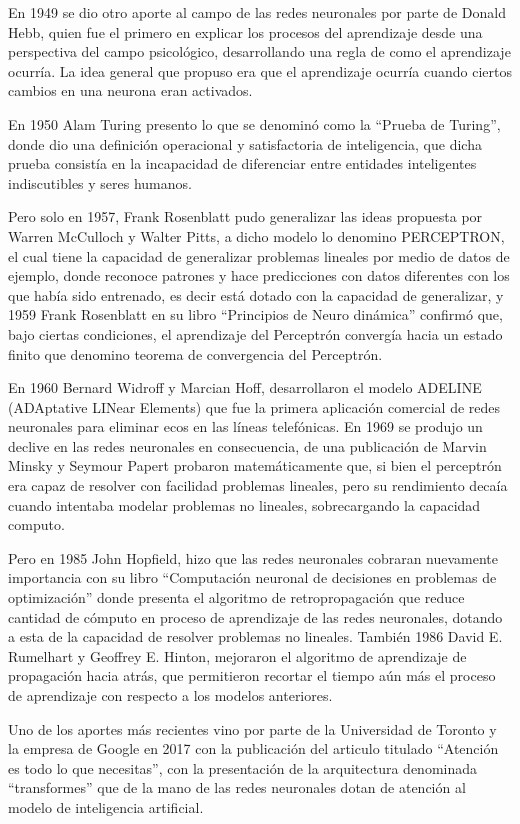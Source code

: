 \documentclass[
  12pt,
]{article}
\begin{document}
En 1949 se dio otro aporte al campo de las redes neuronales por parte de
Donald Hebb, quien fue el primero en explicar los procesos del
aprendizaje desde una perspectiva del campo psicológico, desarrollando
una regla de como el aprendizaje ocurría. La idea general que propuso
era que el aprendizaje ocurría cuando ciertos cambios en una neurona
eran activados.

En 1950 Alam Turing presento lo que se denominó como la ``Prueba de
Turing'', donde dio una definición operacional y satisfactoria de
inteligencia, que dicha prueba consistía en la incapacidad de
diferenciar entre entidades inteligentes indiscutibles y seres humanos.

Pero solo en 1957, Frank Rosenblatt pudo generalizar las ideas propuesta
por Warren McCulloch y Walter Pitts, a dicho modelo lo denomino
PERCEPTRON, el cual tiene la capacidad de generalizar problemas lineales
por medio de datos de ejemplo, donde reconoce patrones y hace
predicciones con datos diferentes con los que había sido entrenado, es
decir está dotado con la capacidad de generalizar, y 1959 Frank
Rosenblatt en su libro ``Principios de Neuro dinámica'' confirmó que,
bajo ciertas condiciones, el aprendizaje del Perceptrón convergía hacia
un estado finito que denomino teorema de convergencia del Perceptrón.

En 1960 Bernard Widroff y Marcian Hoff, desarrollaron el modelo ADELINE
(ADAptative LINear Elements) que fue la primera aplicación comercial de
redes neuronales para eliminar ecos en las líneas telefónicas. En 1969
se produjo un declive en las redes neuronales en consecuencia, de una
publicación de Marvin Minsky y Seymour Papert probaron matemáticamente
que, si bien el perceptrón era capaz de resolver con facilidad problemas
lineales, pero su rendimiento decaía cuando intentaba modelar problemas
no lineales, sobrecargando la capacidad computo.

Pero en 1985 John Hopfield, hizo que las redes neuronales cobraran
nuevamente importancia con su libro ``Computación neuronal de decisiones
en problemas de optimización'' donde presenta el algoritmo de
retropropagación que reduce cantidad de cómputo en proceso de
aprendizaje de las redes neuronales, dotando a esta de la capacidad de
resolver problemas no lineales. También 1986 David E. Rumelhart y
Geoffrey E. Hinton, mejoraron el algoritmo de aprendizaje de propagación
hacia atrás, que permitieron recortar el tiempo aún más el proceso de
aprendizaje con respecto a los modelos anteriores.

Uno de los aportes más recientes vino por parte de la Universidad de
Toronto y la empresa de Google en 2017 con la publicación del articulo
titulado ``Atención es todo lo que necesitas'', con la presentación de
la arquitectura denominada ``transformes'' que de la mano de las redes
neuronales dotan de atención al modelo de inteligencia artificial.
\end{document}
